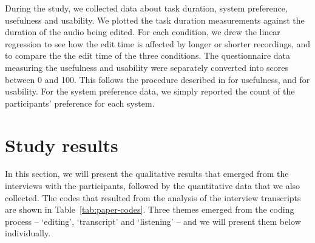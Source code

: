 During the study, we collected data about task duration, system preference, usefulness and usability.
We plotted the task duration measurements against the duration of the audio being edited. For each condition, we drew
the linear regression to see how the edit time is affected by longer or shorter recordings, and to compare the the edit
time of the three conditions.
The questionnaire data measuring the usefulness and usability were separately converted into scores between 0 and 100.
This follows the procedure described in \citet{Davis1989} for usefulness, and \citet{Brooke1996} for usability.
For the system preference data, we simply reported the count of the participants' preference for each system.

\section{Study results}\label{sec:paper-results}

In this section, we will present the qualitative results that emerged from the interviews with the participants,
followed by the quantitative data that we also collected.  The codes that resulted from the analysis of the interview
transcripts are shown in Table~\ref{tab:paper-codes}. Three themes emerged from the coding process -- `editing',
`transcript' and `listening' -- and we will present them below individually. 


